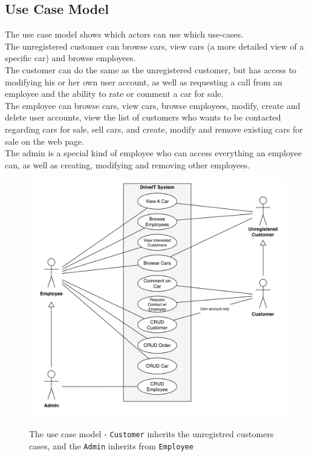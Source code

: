\subsection{Use Case Model}
The use case model shows which actors can use which use-cases.\\

The unregistered customer can browse cars, view cars (a more detailed view of a specific car) and browse employees.\\
The customer can do the same as the unregistered customer, but has access to modifying his or her own user account, as well as requesting a call from an employee and the ability to rate or comment a car for sale.\\

The employee can browse cars, view cars, browse employees, modify, create and delete user accounts, view the list of customers who wants to be contacted regarding cars for sale, sell cars, and create, modify and remove existing cars for sale on the web page.\\

The admin is a special kind of employee who can access everything an employee can, as well as creating, modifying and removing other employees.\\

\begin{figure}[h!]
    \centering
        \includegraphics[scale=0.4]{Figures/UseCase-Model}\\
    \caption{The use case model - \texttt{Customer} inherits the unregistred customers cases, and the \texttt{Admin} inherits from \texttt{Employee}}
  \label{fig:UseCaseModel}
\end{figure}

